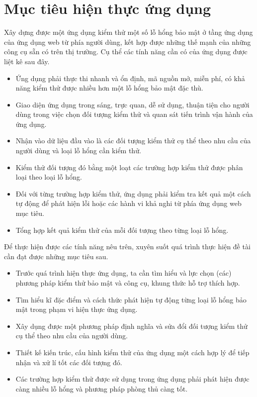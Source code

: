 \section{Mục tiêu hiện thực ứng dụng}
Xây dựng được một ứng dụng kiểm thử một số lỗ hổng bảo mật ở tầng ứng dụng của ứng dụng web từ phía người dùng, kết hợp được những thế mạnh của những công cụ sẵn có trên thị trường. Cụ thể các tính năng cần có của ứng dụng được liệt kê sau đây.
\begin{itemize}
    \item Ứng dụng phải thực thi nhanh và ổn định, mã nguồn mở, miễn phí, có khả năng kiểm thử được nhiều hơn một lỗ hổng bảo mật đặc thù.
    \item Giao diện ứng dụng trong sáng, trực quan, dễ sử dụng, thuận tiện cho người dùng trong việc chọn đối tượng kiểm thử và quan sát tiến trình vận hành của ứng dụng.
    \item Nhận vào dữ liệu đầu vào là các đối tượng kiểm thử cụ thể theo nhu cầu của người dùng và loại lỗ hổng cần kiểm thử.
    \item Kiểm thử đối tượng đó bằng một loạt các trường hợp kiểm thử được phân loại theo loại lỗ hổng.
    \item Đối với từng trường hợp kiểm thử, ứng dụng phải kiểm tra kết quả một cách tự động để phát hiện lỗi hoặc các hành vi khả nghi từ phía ứng dụng web mục tiêu.
    \item Tổng hợp kết quả kiểm thử của mỗi đối tượng theo từng loại lỗ hổng.
\end{itemize}
Để thực hiện được các tính năng nêu trên, xuyên suốt quá trình thực hiện đề tài cần đạt được những mục tiêu sau.
\begin{itemize}
    \item Trước quá trình hiện thực ứng dụng, ta cần tìm hiểu và lực chọn (các) phương pháp kiểm thử bảo mật và công cụ, khung thức hỗ trợ thích hợp.
    \item Tìm hiểu kĩ đặc điểm và cách thức phát hiện tự động từng loại lỗ hổng bảo mật trong phạm vi hiện thực ứng dụng.
    \item Xây dụng được một phương pháp định nghĩa và sửa đổi đối tượng kiểm thử cụ thể  theo nhu cầu của người dùng.
    \item Thiết kế kiến trúc, cấu hình kiểm thử của ứng dụng một cách hợp lý để tiếp nhận và xử lí tốt các đối tượng đó.
    \item Các trường hợp kiểm thử được sử dụng trong ứng dụng phải phát hiện được càng nhiều lỗ hổng và phương pháp phòng thủ càng tốt.
\end{itemize}

